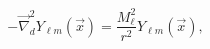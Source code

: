 \begin{equation}
-\vec{\nabla }_{d}^{2}Y_{\ell m}\left(\vec{x}\right)=\frac{M_{\ell }^{2}}{r^{2}}Y_{\ell m}\left(\vec{x}\right),\end{equation}

